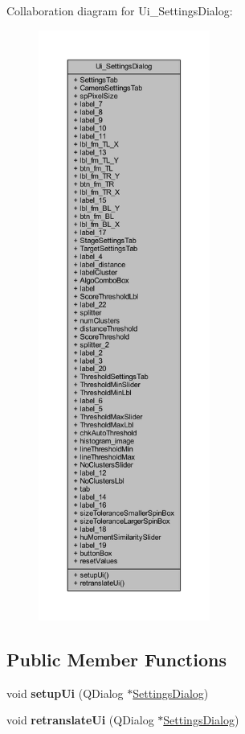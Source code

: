 Collaboration diagram for Ui\+\_\+\+Settings\+Dialog\+:
\nopagebreak
\begin{figure}[H]
\begin{center}
\leavevmode
\includegraphics[height=550pt]{class_ui___settings_dialog__coll__graph}
\end{center}
\end{figure}
\subsection*{Public Member Functions}
\begin{DoxyCompactItemize}
\item 
\mbox{\label{class_ui___settings_dialog_a4666ab89748eeb11cdb95d857bd02c6e}} 
void {\bfseries setup\+Ui} (Q\+Dialog $\ast$\hyperlink{class_settings_dialog}{Settings\+Dialog})
\item 
\mbox{\label{class_ui___settings_dialog_a7a0adf32eef516ceffcc0633a90c3b34}} 
void {\bfseries retranslate\+Ui} (Q\+Dialog $\ast$\hyperlink{class_settings_dialog}{Settings\+Dialog})
\end{DoxyCompactItemize}
